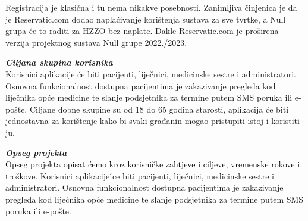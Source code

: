   
              
              \texttt{}{Registracija je klasična i tu nema nikakve posebnosti. Zanimljiva činjenica je da je Reservatic.com dodao naplaćivanje korištenja sustava za sve tvrtke, a Null grupa će to raditi za HZZO bez naplate. Dakle Reservatic.com je proširena verzija projektnog sustava Null grupe 2022./2023.}
              \newline
            
		       \textbf{\textit{Ciljana skupina korisnika}}\\

         
  
            \texttt{}{
            Korisnici aplikacije će biti pacijenti, liječnici, medicinske sestre i administratori. Osnovna funkcionalnost dostupna pacijentima je zakazivanje pregleda kod 
liječnika opće medicine te slanje podsjetnika za termine putem SMS poruka ili 
e-pošte. Ciljane dobne skupine su od 18 do 65 godina starosti, aplikacija će biti jednostavna za korištenje kako bi svaki građanin mogao pristupiti istoj i koristiti ju.  }	

\textbf{\textit{Opseg projekta}}\\
  
            \textcolor{black}{Opseg projekta opisat ćemo kroz korisničke zahtjeve i ciljeve, vremenske rokove i troškove. 
            }
            \texttt{}{Korisnici aplikacije  ́ce biti pacijenti, liječnici, medicinske sestre i administratori. Osnovna funkcionalnost dostupna pacijentima je zakazivanje pregleda kod liječnika opće medicine te slanje podsjetnika za termine putem SMS poruka ili e-pošte.}
\newline


